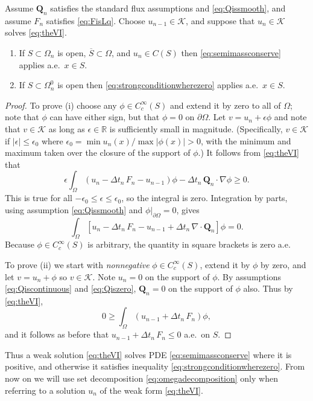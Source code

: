 \documentclass[final,leqno,onefignum,onetabnum]{siamltex1213bueler}
\newcommand\bQ{\mathbf{Q}}
\newcommand{\Div}{\nabla\cdot}
\newcommand\eps{\epsilon}
\renewcommand{\grad}{\nabla}
\newcommand\RR{\mathbb{R}}
\begin{document}
\begin{theorem} \label{thm:weakimpliesstrong}  Assume $\bQ_n$ satisfies the standard flux assumptions and \eqref{eq:Qissmooth}, and assume $F_n$ satisfies \eqref{eq:FisLq}.  Choose $u_{n-1}\in\mathcal{K}$, and suppose that $u_n\in\mathcal{K}$ solves \eqref{eq:theVI}.
\renewcommand{\labelenumi}{\emph{(\roman{enumi})}}
\begin{enumerate}
\item If $S \subset \Omega_n$ is open, $\overline{S}\subset \Omega$, and $u_n\in C(S)$ then \eqref{eq:semimassconserve} applies a.e.~$x\in S$.
\item If $S \subset \Omega_n^0$ is open then \eqref{eq:strongconditionwherezero} applies a.e.~$x\in S$.
\end{enumerate}
\end{theorem}

\begin{proof}  To prove (i) choose any $\phi\in C_c^\infty(S)$ and extend it by zero to all of $\Omega$; note that $\phi$ can have either sign, but that $\phi=0$ on $\partial\Omega$.  Let $v = u_n + \eps \phi$ and note that $v \in \mathcal{K}$ as long as $\eps\in\RR$ is sufficiently small in magnitude.  (Specifically, $v \in \mathcal{K}$ if $|\eps|\le \eps_0$ where $\eps_0 = \min u_n(x) / \max |\phi(x)| > 0$, with the minimum and maximum taken over the closure of the support of $\phi$.)  It follows from \eqref{eq:theVI} that
   $$\eps \int_\Omega \left(u_n - \Delta t_n\,F_n - u_{n-1}\right)\phi - \Delta t_n\,\bQ_n \cdot \grad \phi \ge 0.$$
This is true for all $-\eps_0 \le \eps \le \eps_0$, so the integral is zero.  Integration by parts, using assumption \eqref{eq:Qissmooth} and $\phi\big|_{\partial\Omega}=0$, gives
   $$\int_\Omega \left[ u_n - \Delta t_n\,F_n - u_{n-1} + \Delta t_n\,\Div\bQ_n \right]\phi = 0.$$
Because $\phi\in C_c^\infty(S)$ is arbitrary, the quantity in square brackets is zero a.e.

To prove (ii) we start with \emph{nonnegative} $\phi\in C_c^\infty(S)$, extend it by $\phi$ by zero, and let $v = u_n + \phi$ so $v\in\mathcal{K}$.  Note $u_n=0$ on the support of $\phi$.  By assumptions \eqref{eq:Qiscontinuous} and \eqref{eq:Qiszero}, $\bQ_n=0$ on the support of $\phi$ also.  Thus by \eqref{eq:theVI},
    $$0 \ge \int_{\Omega} \left(u_{n-1} + \Delta t_n\, F_n\right) \phi,$$
and it follows as before that $u_{n-1} + \Delta t_n\, F_n \le 0$ a.e.~on $S$.\end{proof}

Thus a weak solution \eqref{eq:theVI} solves PDE \eqref{eq:semimassconserve} where it is positive, and otherwise it satisfies inequality \eqref{eq:strongconditionwherezero}.  From now on we will use set decomposition \eqref{eq:omegadecomposition} only when referring to a solution $u_n$ of the weak form \eqref{eq:theVI}.
\end{document}
